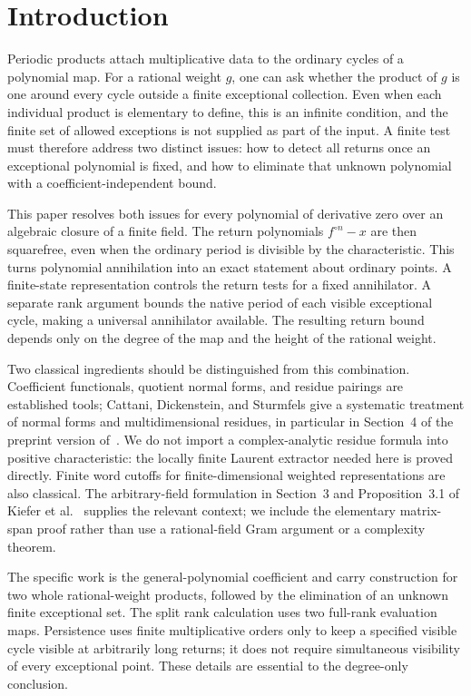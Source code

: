 \section{Introduction}

Periodic products attach multiplicative data to the ordinary cycles
of a polynomial map. For a rational weight $g$, one can ask whether
the product of $g$ is one around every cycle outside a finite
exceptional collection. Even when each individual product is elementary to define,
this is an infinite condition, and the finite set of allowed
exceptions is not supplied as part of the input. A finite test must
therefore address two distinct issues: how to detect all returns
once an exceptional polynomial is fixed, and how to eliminate that
unknown polynomial with a coefficient-independent bound.

This paper resolves both issues for every polynomial of derivative
zero over an algebraic closure of a finite field. The return
polynomials $f^{\circ n}-x$ are then squarefree, even when the
ordinary period is divisible by the characteristic. This turns
polynomial annihilation into an exact statement about ordinary
points. A finite-state representation controls the return tests for
a fixed annihilator. A separate rank argument bounds the native
period of each visible exceptional cycle, making a universal
annihilator available. The resulting return bound depends only on
the degree of the map and the height of the rational weight.

Two classical ingredients should be distinguished from this
combination. Coefficient functionals, quotient normal forms, and
residue pairings are established tools; Cattani, Dickenstein, and
Sturmfels give a systematic treatment of normal forms and
multidimensional residues, in particular in Section~4 of the
preprint version of~\cite{CDS1996}. We do not import a complex-analytic residue
formula into positive characteristic: the locally finite Laurent
extractor needed here is proved directly. Finite word cutoffs for
finite-dimensional weighted representations are also classical.
The arbitrary-field formulation in Section~3 and Proposition~3.1
of Kiefer et al.~\cite{Kiefer2013} supplies the relevant context;
we include the elementary matrix-span proof rather than use a
rational-field Gram argument or a complexity theorem.

The specific work is the general-polynomial coefficient and carry
construction for two whole rational-weight products, followed by
the elimination of an unknown finite exceptional set. The split
rank calculation uses two full-rank evaluation maps. Persistence
uses finite multiplicative orders only to keep a specified visible
cycle visible at arbitrarily long returns; it does not require
simultaneous visibility of every exceptional point. These details
are essential to the degree-only conclusion.

